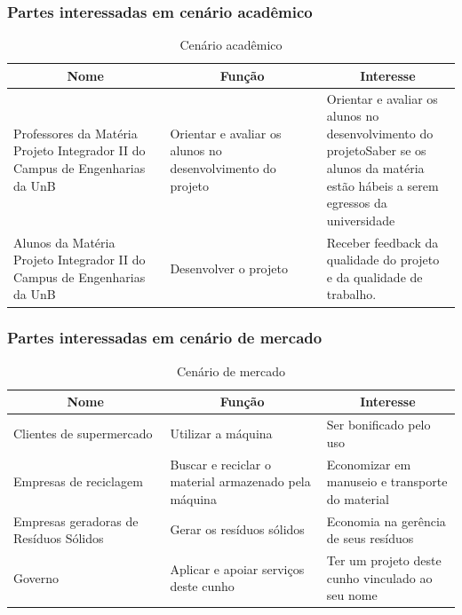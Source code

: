 \begin{apendicesenv}
\subsubsection{Partes interessadas em cenário acadêmico}

\begin{table}[htp]
    \centering
    \caption{Cenário acadêmico}
    \label{my-label}
    \begin{tabular}{|p{0.35\linewidth}|p{0.35\linewidth}|p{0.35\linewidth}|}
    \hline
    \multicolumn{1}{|c|}{\textbf{Nome}} & \multicolumn{1}{c|}{\textbf{Função}} & \multicolumn{1}{c|}{\textbf{Interesse}} \\ \hline
    Professores da Matéria Projeto Integrador II do Campus de Engenharias da UnB & Orientar e avaliar os alunos no desenvolvimento do projeto & Orientar e avaliar os alunos no desenvolvimento do projetoSaber se os alunos da matéria estão hábeis a serem egressos da universidade \\ \hline
    Alunos da Matéria Projeto Integrador II do Campus de Engenharias da UnB & Desenvolver o projeto & Receber feedback da qualidade do projeto e da qualidade de trabalho. \\ \hline
    \end{tabular}
\end{table}

\subsubsection{Partes interessadas em cenário de mercado}

\begin{table}[htp]
    \centering
    \caption{Cenário de mercado}
    \label{my-label}
    \begin{tabular}{|p{0.35\linewidth}|p{0.35\linewidth}|p{0.35\linewidth}|}
    \hline
    \multicolumn{1}{|c|}{\textbf{Nome}} & \multicolumn{1}{c|}{\textbf{Função}} & \multicolumn{1}{c|}{\textbf{Interesse}} \\ \hline
    Clientes de supermercado & Utilizar a máquina & Ser bonificado pelo uso \\ \hline
    Empresas de reciclagem & Buscar e reciclar o material armazenado pela máquina & Economizar em manuseio e transporte do material \\ \hline
    Empresas geradoras de Resíduos Sólidos & Gerar os resíduos sólidos & Economia na gerência de seus resíduos \\ \hline
    Governo & Aplicar e apoiar serviços deste cunho & Ter um projeto deste cunho vinculado ao seu nome \\ \hline
    \end{tabular}
\end{table}


\end{apendicesenv}
